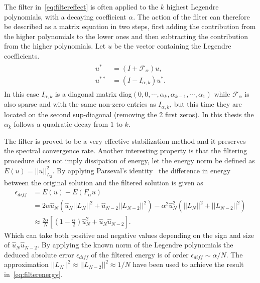 The filter in~\ref{eq:filtereffect} is often applied to the $k$ highest Legendre polynomials,
with a decaying coefficient $\alpha$. The action of the filter can therefore be described as 
a matrix equation in two steps, first adding the contribution from the higher polynomials to the 
lower ones and then subtracting the contribution from the higher polynomials. Let $u$ be the 
vector containing the Legendre coefficients.
\begin{align}
    \begin{split}
    u^* &=(I+\mathcal{F}_{\alpha})u, \\
    u^{**} &= (I-I_{\alpha,k})u^*.
    \end{split}
    \label{eq:filterstepwise}
\end{align}
In this case $I_{\alpha,k}$ is a diagonal matrix 
diag$(0,0,\cdots,\alpha_k,\alpha_{k-1},\cdots,\alpha_1)$ 
while $\mathcal{F}_{\alpha}$ is also sparse and with the same non-zero entries as $I_{\alpha,k}$,
but this time they are located on the second sup-diagonal (removing the 2 first zeros). 
In this thesis the $\alpha_k$ follows a quadratic decay from $1$ to $k$.

The filter is proved to be a very effective stabilization method and it preserves the 
spectral convergence rate. Another interesting property is that the filtering procedure 
does not imply dissipation of energy, let the energy norm be defined as $E(u) = ||u||_{L_2}^2$.  
By applying Parseval's identity~\cite{Young} the difference in energy between the original solution
and the filtered solution is given as 
\begin{align}
   \epsilon_{diff}&=E(u) - E(F_{\alpha}u) \\
                &= 2\alpha\hat{u}_N(\hat{u}_N||L_N||^2+\hat{u}_{N-2}||L_{N-2}||^2)
    - \alpha^2\hat{u}^2_N(||L_N||^2+||L_{N-2}||^2)\\
    &\approx \frac{2\alpha}{N}\left[  (1-\frac{\alpha}{2})\hat{u}_N^2 + 
    \hat{u}_N\hat{u}_{N-2}\right].
    \label{eq:filterenergy}
\end{align}
Which can take both positive and negative values depending on the sign and size of
$\hat{u}_N\hat{u}_{N-2}$. By applying the known norm of the Legendre polynomials 
the deduced absolute error $\epsilon_{diff}$ of the filtered energy is of order 
$\epsilon_{diff}\sim \alpha/N$. The approximation $||L_N||^2\approx||L_{N-2}||^2\approx 1/N$
have been used to achieve the result in~\ref{eq:filterenergy}.

